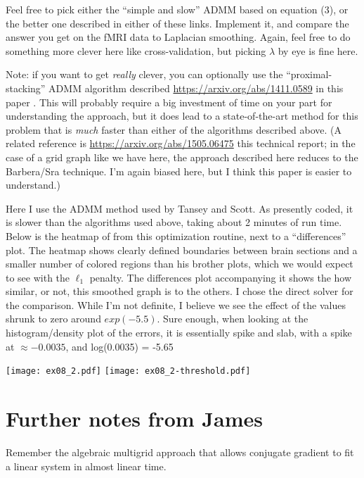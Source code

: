 \documentclass{article}
\begin{document}
\begin{enumerate}[(A)]
Feel free to pick either the ``simple and slow'' ADMM based on equation (3), or the better one described in either of these links.  Implement it, and compare the answer you get on the fMRI data to Laplacian smoothing.  Again, feel free to do something more clever here like cross-validation, but picking $\lambda$ by eye is fine here.

Note: if you want to get \textit{really} clever, you can optionally use the ``proximal-stacking'' ADMM algorithm described \url{https://arxiv.org/abs/1411.0589} in this paper .  This will probably require a big investment of time on your part for understanding the approach, but it does lead to a state-of-the-art method for this problem that is \textit{much} faster than either of the algorithms described above.  (A related reference is \url{https://arxiv.org/abs/1505.06475} this technical report; in the case of a grid graph like we have here, the approach described here reduces to the Barbera/Sra technique.  I'm again biased here, but I think this paper is easier to understand.)

\color{blue}
Here I use the ADMM method used by Tansey and Scott. As presently coded, it is slower than the algorithms used above, taking about 2 minutes of run time. Below is the heatmap of from this optimization routine, next to a ``differences'' plot. The heatmap shows clearly defined boundaries between brain sections and a smaller number of colored regions than his brother plots, which we would expect to see with the $\ell_1$ penalty. The differences plot accompanying it shows the how similar, or not, this smoothed graph is to the others. I chose the direct solver for the comparison. While I'm not definite, I believe we see the effect of the values shrunk to zero around $exp(-5.5)$. Sure enough, when looking at the histogram/density plot of the errors, it is essentially spike and slab, with a spike at $\approx -0.0035$, and log(0.0035) = -5.65
\begin{center}
\texttt{[image: ex08\_2.pdf]}
\texttt{[image: ex08\_2-threshold.pdf]}
\end{center}
\color{black}



\end{enumerate}

\color{red}
\section{Further notes from James}
Remember the algebraic multigrid approach that allows conjugate gradient to fit a linear system in almost linear time. 
\end{document}
